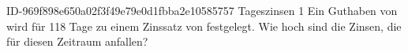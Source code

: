 \begin{exercise}
      {ID-969f898e650a02f3f49e79e0d1fbba2e10585757}
      {Tageszinsen 1}
  \ifproblem\problem
    Ein Guthaben von  wird für \num{118} Tage zu einem Zinssatz
    von  festgelegt. Wie hoch sind die Zinsen, die für diesen Zeitraum
    anfallen?
  \fi
\end{exercise}
